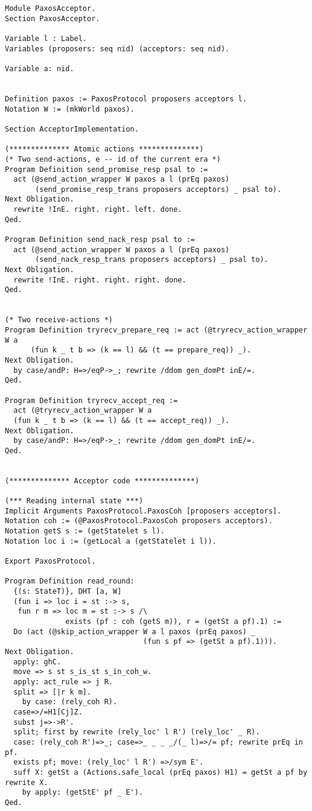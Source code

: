 \begin{landscape}
\begin{multicols*}{2}
\begin{lstlisting}[style=SourceCodeListing]
Module PaxosAcceptor.
Section PaxosAcceptor.

Variable l : Label.
Variables (proposers: seq nid) (acceptors: seq nid).

Variable a: nid.


Definition paxos := PaxosProtocol proposers acceptors l.
Notation W := (mkWorld paxos).

Section AcceptorImplementation.

(************** Atomic actions **************)
(* Two send-actions, e -- id of the current era *)
Program Definition send_promise_resp psal to :=
  act (@send_action_wrapper W paxos a l (prEq paxos)
       (send_promise_resp_trans proposers acceptors) _ psal to).
Next Obligation.
  rewrite !InE. right. right. left. done.
Qed.

Program Definition send_nack_resp psal to :=
  act (@send_action_wrapper W paxos a l (prEq paxos)
       (send_nack_resp_trans proposers acceptors) _ psal to).
Next Obligation.
  rewrite !InE. right. right. right. done.
Qed.


(* Two receive-actions *)
Program Definition tryrecv_prepare_req := act (@tryrecv_action_wrapper W a
      (fun k _ t b => (k == l) && (t == prepare_req)) _).
Next Obligation.
  by case/andP: H=>/eqP->_; rewrite /ddom gen_domPt inE/=.
Qed.

Program Definition tryrecv_accept_req :=
  act (@tryrecv_action_wrapper W a
  (fun k _ t b => (k == l) && (t == accept_req)) _).
Next Obligation.
  by case/andP: H=>/eqP->_; rewrite /ddom gen_domPt inE/=.
Qed.


(************** Acceptor code **************)

(*** Reading internal state ***)
Implicit Arguments PaxosProtocol.PaxosCoh [proposers acceptors].
Notation coh := (@PaxosProtocol.PaxosCoh proposers acceptors).
Notation getS s := (getStatelet s l).
Notation loc i := (getLocal a (getStatelet i l)).

Export PaxosProtocol.

Program Definition read_round:
  {(s: StateT)}, DHT [a, W]
  (fun i => loc i = st :-> s,
   fun r m => loc m = st :-> s /\
              exists (pf : coh (getS m)), r = (getSt a pf).1) :=
  Do (act (@skip_action_wrapper W a l paxos (prEq paxos) _
                                (fun s pf => (getSt a pf).1))).
Next Obligation.
  apply: ghC.
  move => s st s_is_st s_in_coh_w.
  apply: act_rule => j R.
  split => [|r k m].
    by case: (rely_coh R).
  case=>/=H1[Cj]Z.
  subst j=>->R'.
  split; first by rewrite (rely_loc' l R') (rely_loc' _ R).
  case: (rely_coh R')=>_; case=>_ _ _ _/(_ l)=>/= pf; rewrite prEq in pf.
  exists pf; move: (rely_loc' l R') =>/sym E'.
  suff X: getSt a (Actions.safe_local (prEq paxos) H1) = getSt a pf by rewrite X.
    by apply: (getStE' pf _ E').
Qed.


\end{lstlisting}
\end{multicols*}
\end{landscape}
